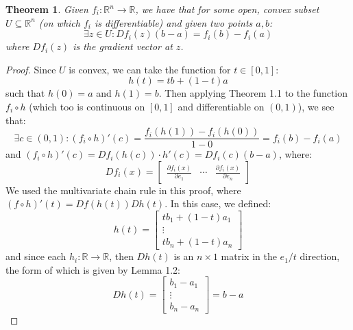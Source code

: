 \documentclass[10pt,letterpaper]{article} %
\newtheorem{thm}{Theorem}[section]
\begin{document}
\begin{thm}
Given $f_i: \mathbb{R}^n \xrightarrow{} \mathbb{R}$, we have that for some open, convex subset $U \subseteq \mathbb{R}^n$ (on which $f_i$ is differentiable) and given two points $a, b$:
\begin{equation*}
\exists z \in U: Df_i(z)(b-a) = f_i(b) - f_i(a)
\end{equation*}
where $Df_i(z)$ is the gradient vector at $z$.
\end{thm}
\begin{proof}
Since $U$ is convex, we can take the function for $t \in [0, 1]$:
\begin{equation*}
h(t) = t b + (1-t) a
\end{equation*}
such that $h(0) = a$ and $h(1) = b$. Then applying Theorem 1.1 to the function $f_i \circ h$ (which too is continuous on $[0, 1]$ and differentiable on $(0, 1)$), we see that:
\begin{equation*}
\exists c \in (0, 1): (f_i \circ h)'(c) = \frac{f_i(h(1)) - f_i(h(0))}{1-0} = f_i(b) - f_i(a)
\end{equation*}
and $(f_i \circ h)'(c) = Df_i(h(c)) \cdot h'(c) = Df_i(c)(b-a)$, where:
\begin{equation*}
Df_i(x) = \begin{bmatrix}
\frac{\partial f_i(x)}{\partial e_1} & \cdots & \frac{\partial f_i(x)}{\partial e_n}
\end{bmatrix}
\end{equation*}
We used the multivariate chain rule in this proof, where $(f \circ h)'(t) = Df(h(t))Dh(t)$. In this case, we defined:
\begin{equation*}
h(t) = \begin{bmatrix}
t b_1 + (1-t)a_1\\
\vdots\\
t b_n + (1-t)a_n
\end{bmatrix}
\end{equation*}
and since each $h_i: \mathbb{R} \xrightarrow{} \mathbb{R}$, then $Dh(t)$ is an $n \times 1$ matrix in the $e_1/t$ direction, the form of which is given by Lemma 1.2:
\begin{equation*}
Dh(t) = \begin{bmatrix}
b_1 - a_1\\
\vdots\\
b_n - a_n
\end{bmatrix} = b-a
\end{equation*}
\end{proof}
\end{document}

